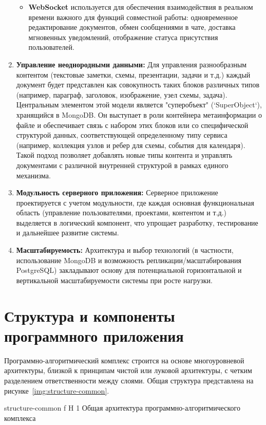 \begin{enumerate}[wide=12.5mm, leftmargin=12.5mm]
\begin{itemize}
            \item \textbf{WebSocket} используется для обеспечения взаимодействия в реальном времени важного для функций совместной работы: одновременное редактирование документов, обмен сообщениями в чате, доставка мгновенных уведомлений, отображение статуса присутствия пользователей.
        \end{itemize}
    \item \textbf{Управление неоднородными данными:} Для управления разнообразным контентом (текстовые заметки, схемы, презентации, задачи и т.д.) каждый документ будет представлен как совокупность таких блоков различных типов (например, параграф, заголовок, изображение, узел схемы, задача). Центральным элементом этой модели является "суперобъект" (`SuperObject`), хранящийся в MongoDB. Он выступает в роли контейнера метаинформации о файле и обеспечивает связь с набором этих блоков или со специфической структурой данных, соответствующей определенному типу сервиса (например, коллекция узлов и ребер для схемы, события для календаря). Такой подход позволяет добавлять новые типы контента и управлять документами с различной внутренней структурой в рамках единого механизма.
    \item \textbf{Модульность серверного приложения:} Серверное приложение проектируется с учетом модульности, где каждая основная функциональная область (управление пользователями, проектами, контентом и т.д.) выделяется в логический компонент, что упрощает разработку, тестирование и дальнейшее развитие системы.
    \item \textbf{Масштабируемость:} Архитектура и выбор технологий (в частности, использование MongoDB и возможность репликации/масштабирования PostgreSQL) закладывают основу для потенциальной горизонтальной и вертикальной масштабируемости системы при росте нагрузки.
\end{enumerate}

\section{Структура и компоненты программного приложения}

Программно-алгоритмический комплекс строится на основе многоуровневой архитектуры, близкой к принципам чистой или луковой архитектуры, с четким разделением ответственности между слоями.
Общая структура представлена на рисунке~\ref{img:structure-common}.

	{structure-common}
	{f}
	{H}
	{1\textwidth}
	{Общая архитектура программно-алгоритмического комплекса}


